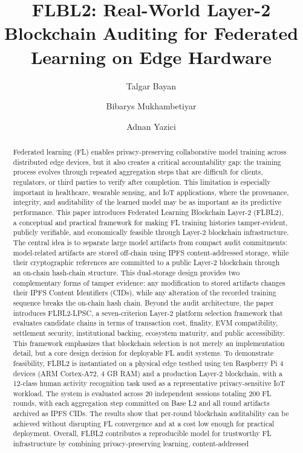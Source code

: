\documentclass{llncs}
\begin{document}
\title{FLBL2: Real-World Layer-2 Blockchain Auditing for Federated Learning on Edge Hardware}

\author{Talgar Bayan \and Bibarys Mukhambetiyar  \and Adnan Yazici}



\maketitle

\begin{abstract}
Federated learning (FL) enables privacy-preserving collaborative model training across distributed edge devices, but it also creates a critical accountability gap: the training process evolves through repeated aggregation steps that are difficult for clients, regulators, or third parties to verify after completion. This limitation is especially important in healthcare, wearable sensing, and IoT applications, where the provenance, integrity, and auditability of the learned model may be as important as its predictive performance. This paper introduces Federated Learning Blockchain Layer-2 (FLBL2), a conceptual and practical framework for making FL training histories tamper-evident, publicly verifiable, and economically feasible through Layer-2 blockchain infrastructure. The central idea is to separate large model artifacts from compact audit commitments: model-related artifacts are stored off-chain using IPFS content-addressed storage, while their cryptographic references are committed to a public Layer-2 blockchain through an on-chain hash-chain structure. This dual-storage design provides two complementary forms of tamper evidence: any modification to stored artifacts changes their IPFS Content Identifiers (CIDs), while any alteration of the recorded training sequence breaks the on-chain hash chain. Beyond the audit architecture, the paper introduces FLBL2-LPSC, a seven-criterion Layer-2 platform selection framework that evaluates candidate chains in terms of transaction cost, finality, EVM compatibility, settlement security, institutional backing, ecosystem maturity, and public accessibility. This framework emphasizes that blockchain selection is not merely an implementation detail, but a core design decision for deployable FL audit systems. To demonstrate feasibility, FLBL2 is instantiated on a physical edge testbed using ten Raspberry Pi 4 devices (ARM Cortex-A72, 4 GB RAM) and a production Layer-2 blockchain, with a 12-class human activity recognition task used as a representative privacy-sensitive IoT workload. The system is evaluated across 20 independent sessions totaling 200 FL rounds, with each aggregation step committed on Base L2 and all round artifacts archived as IPFS CIDs. The results show that per-round blockchain auditability can be achieved without disrupting FL convergence and at a cost low enough for practical deployment. Overall, FLBL2 contributes a reproducible model for trustworthy FL infrastructure by combining privacy-preserving learning, content-addressed 
\end{abstract}
\end{document}

